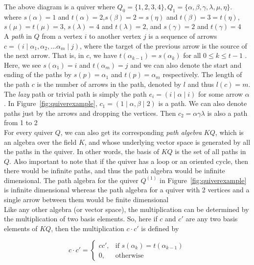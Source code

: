 \documentclass{article}
\numberwithin{figure}{section}
\begin{document}
 The above diagram is a quiver where $Q_0=\{1,2,3,4\},Q_1=\{\alpha,\beta,\gamma,\lambda,\mu,\eta\}$. where $s(\alpha)=1$ and $t(\alpha)=2$,$s(\beta)=2=s(\eta)$ and $t(\beta)=3=t(\eta)$, $s(\mu)=t(\mu)=3$, $s(\lambda)=4$ and $t(\lambda)=2$, and $s(\gamma)=2$ and $t(\gamma)=4$\\


 A \textit{path} in $Q$ from a vertex $i$ to another vertex $j$ is a sequence of arrows  $c=(i\mid\alpha_1,\alpha_2,...\alpha_m\mid j)$, where the target of the previous arrow is the source of the next arrow. That is, in $c$, we have $t(\alpha_{k-1})=s(\alpha_k)$ for all $0\leq k \leq t-1$ . Here, we see $s(\alpha_1)=i$ and $t(\alpha_{m})=j$ and we can also denote the start and ending of the paths by $s(p)=\alpha_1$ and $t(p)=\alpha_m$ respectively. The length of the path $c$ is the number of arrows in the path, denoted by $l$ and thus $l(c)=m$. The \textit{lazy} path or trivial path is simply the path $e_i=(i\mid \alpha \mid i)$ for some arrow $\alpha$. In Figure~\ref{fig:quiverexample}, $c_1=(1\mid \alpha,\beta\mid 2)$ is a path. We can also denote paths just by the arrows and dropping the vertices. Then $c_2=\alpha\gamma\lambda$ is also a path from 1 to 2\\
 

 For every quiver $Q$, we can also get its corresponding \textit{path algebra} $KQ$, which is an algebra over the field $K$, and whose underlying vector space is generated by all the paths in the quiver. In other words, the basis of $KQ$ is the set of all paths in $Q$. Also important to note that if the quiver has a loop or an oriented cycle, then there would be infinite paths, and thus the path algebra would be infinite dimensional. The path algebra for the quiver $Q^{(1)}$ in Figure~\ref{fig:quiverexample} is infinite dimensional whereas the path algebra for a quiver with 2 vertices and a single arrow between them would be finite dimensional\\
 
 Like any other algebra (or vector space), the multiplication can be determined by the multiplication of two basis elements. So, here if $c$ and $c'$ are any two basis elements of $KQ$, then the multiplication $c \cdot c'$ is defined by 

 \[
c \cdot c' = 
\begin{cases}c  c' , & \text{if } s(\alpha_k)=t(\alpha_{k-1}) \\
0, & \text{otherwise }
\end{cases}
\]
\end{document}
